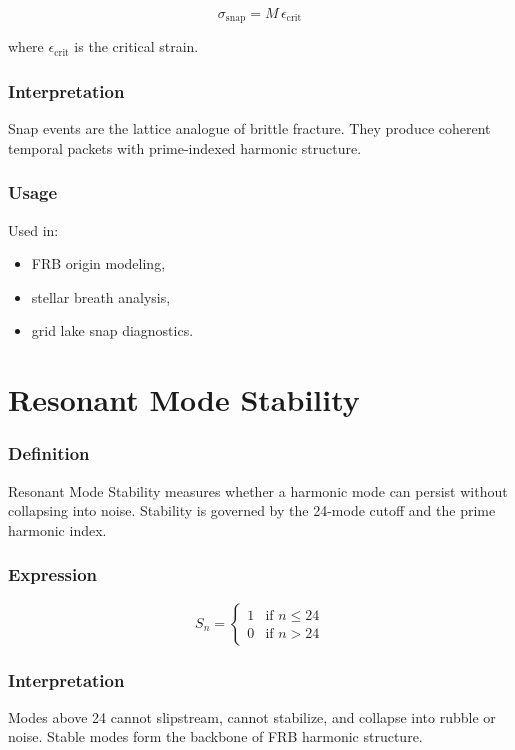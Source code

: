 \documentclass[12pt,oneside]{book}
\begin{document}
\[
\sigma_{\mathrm{snap}} = M \, \epsilon_{\mathrm{crit}}
\]


where $\epsilon_{\mathrm{crit}}$ is the critical strain.

\subsubsection{Interpretation}
Snap events are the lattice analogue of brittle fracture.  
They produce coherent temporal packets with prime-indexed harmonic structure.

\subsubsection{Usage}
Used in:
\begin{itemize}
    \item FRB origin modeling,
    \item stellar breath analysis,
    \item grid lake snap diagnostics.
\end{itemize}


\section{Resonant Mode Stability}

\subsubsection{Definition}
Resonant Mode Stability measures whether a harmonic mode can persist without collapsing into
noise. Stability is governed by the 24-mode cutoff and the prime harmonic index.

\subsubsection{Expression}


\[
S_n = 
\begin{cases}
1 & \text{if } n \leq 24 \\
0 & \text{if } n > 24
\end{cases}
\]



\subsubsection{Interpretation}
Modes above 24 cannot slipstream, cannot stabilize, and collapse into rubble or noise.  
Stable modes form the backbone of FRB harmonic structure.
\end{document}
